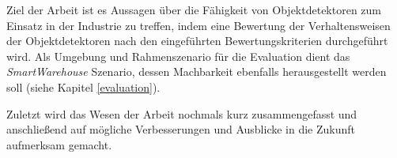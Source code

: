Ziel der Arbeit ist es Aussagen über die Fähigkeit von Objektdetektoren zum Einsatz in der Industrie zu treffen, indem eine Bewertung der Verhaltensweisen der Objektdetektoren nach den eingeführten Bewertungskriterien durchgeführt wird. Als Umgebung und Rahmenszenario für die Evaluation dient das \textit{SmartWarehouse} Szenario, dessen Machbarkeit ebenfalls herausgestellt werden soll (siehe Kapitel \ref{evaluation}).

Zuletzt wird das Wesen der Arbeit nochmals kurz zusammengefasst und anschließend auf mögliche Verbesserungen und Ausblicke in die Zukunft aufmerksam gemacht. 
